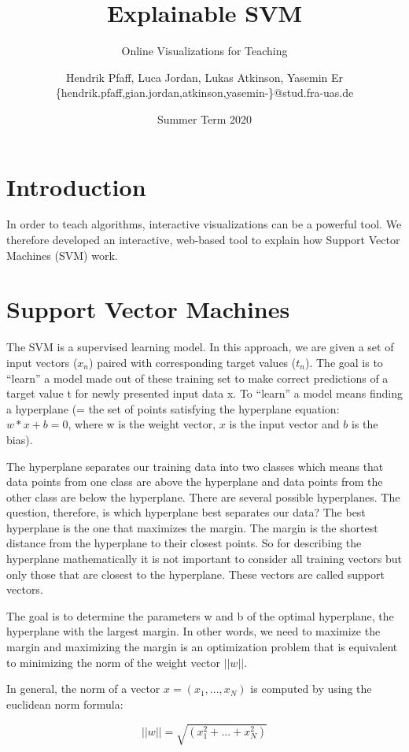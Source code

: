 \documentclass{scrartcl}
\title{Explainable SVM}
\subtitle{Online Visualizations for Teaching}
\author{
  Hendrik Pfaff, Luca Jordan, Lukas Atkinson, Yasemin Er
  \\
  {\normalsize\ttfamily \{hendrik.pfaff,gian.jordan,atkinson,yasemin-\}@stud.fra-uas.de}
}
\date{Summer Term 2020}
\begin{document}
\maketitle

\section{Introduction}

In order to teach algorithms, interactive visualizations can be a powerful tool.
We therefore developed an interactive, web-based tool
to explain how Support Vector Machines (SVM) work.

\section{Support Vector Machines}
The SVM is a supervised learning model. In this approach, we are given a set of input vectors ($x_n$) paired with corresponding target values ($t_n$). 
The goal is to “learn” a model made out of these training set to make correct predictions of a target value t for newly presented input data x. 
To “learn” a model means finding a hyperplane (= the set of points satisfying the hyperplane equation: $w*x+b = 0$, where w is the weight vector, $x$ is the input vector and $b$ is the bias).

The hyperplane separates our training data into two classes which means that data points from one class are above the hyperplane and data points from the other class are below the hyperplane. 
There are several possible hyperplanes. The question, therefore, is which hyperplane best separates our data? The best hyperplane is the one that maximizes the margin. The margin is the shortest distance from the hyperplane to their closest points. 
So for describing the hyperplane mathematically it is not important to consider all training vectors but only those that are closest to the hyperplane. These vectors are called support vectors. 

The goal is to determine the parameters w and b of the optimal hyperplane, the hyperplane with the largest margin. In other words, we need to maximize the margin and maximizing the margin is an optimization problem that is equivalent to minimizing the norm of the weight vector $||w||$. 

In general, the norm of a vector $x = (x_1,...,x_N)$ is computed by using the euclidean norm formula: 

\[||w||=\sqrt{(x_{1}^{2}+...+x_{N}^{2})}\]
\end{document}
